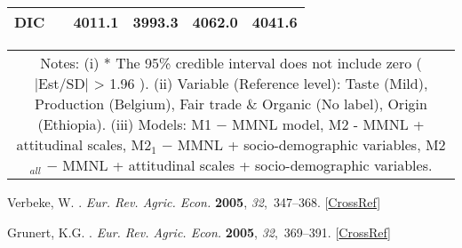\documentclass[sustainability,article,accept,moreauthors,pdftex,10pt,a4paper]{Definitions/mdpi}
\theoremstyle{mdpi}
\newcounter{ex}
\newcounter{re}
\theoremstyle{mdpidefinition}
\begin{document}
{{\begin{table}[H]
{\begin{tabular}{p{2cm}p{2.5cm}p{2.5cm}p{2.5cm}p{2.5cm} p{2.5cm}}
\midrule
DIC       &                      & 4011.1                           & 3993.3                        & 4062.0                               & 4041.6 \\  \bottomrule
\end{tabular}}
\begin{tabular}{@{}c@{}}
\multicolumn{1}{p{\textwidth -.75in}}{\footnotesize Notes: (i) * The 95\% credible interval does not include zero ( |Est/SD| > 1.96 ). (ii) Variable (Reference level): Taste (Mild), Production (Belgium), Fair trade \& Organic (No label), Origin (Ethiopia). (iii) Models: M1 $-$ MMNL model, M2 - MMNL + attitudinal scales, M2$_1$ $-$ MMNL + socio-demographic variables, M2$_{all}$ $ -$ MMNL + attitudinal scales + socio-demographic variables.}
\end{tabular}

\end{table}
}
\begin{thebibliography}{999}

Verbeke, W.
.
\newblock  \emph{Eur. Rev. Agric. Econ.}  \textbf{2005}, \emph{32},~347--368.
 [\href{http://dx.doi.org/10.1093/eurrag/jbi017}{CrossRef}]

Grunert, K.G.
.
\newblock  \emph{Eur. Rev. Agric. Econ.}  \textbf{2005}, \emph{32},~369--391. [\href{http://dx.doi.org/10.1093/eurrag/jbi011}{CrossRef}]


\end{thebibliography}}
\end{document}
